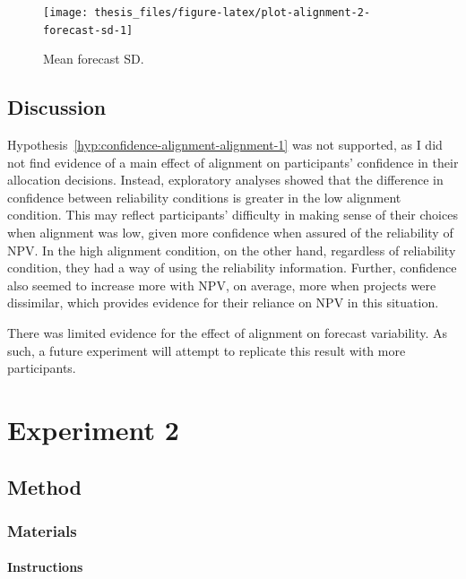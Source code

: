 \documentclass[a4paper, nobind, dvipsnames]{templates/ociamthesis}
\theoremstyle{definition}
\theoremstyle{definition}
\theoremstyle{definition}
\theoremstyle{definition}
\theoremstyle{remark}
\begin{document}
\begin{figure}
\texttt{[image: thesis\_files/figure-latex/plot-alignment-2-forecast-sd-1]} \caption{Mean forecast SD.}\label{fig:plot-alignment-2-forecast-sd}
\end{figure}

\hypertarget{discussion-9}{%
\subsection{Discussion}\label{discussion-9}}

Hypothesis~\ref{hyp:confidence-alignment-alignment-1} was not supported, as I did not find evidence of a main effect of alignment on participants' confidence in their allocation decisions. Instead, exploratory analyses showed that the difference in confidence between reliability conditions is greater in the low alignment condition. This may reflect participants' difficulty in making sense of their choices when alignment was low, given more confidence when assured of the reliability of NPV. In the high alignment condition, on the other hand, regardless of reliability condition, they had a way of using the reliability information. Further, confidence also seemed to increase more with NPV, on average, more when projects were dissimilar, which provides evidence for their reliance on NPV in this situation.

There was limited evidence for the effect of alignment on forecast variability. As such, a future experiment will attempt to replicate this result with more participants.

\hypertarget{alignment-3-appendix}{%
\section{Experiment 2}\label{alignment-3-appendix}}

\hypertarget{method-11}{%
\subsection{Method}\label{method-11}}

\hypertarget{materials-10}{%
\subsubsection{Materials}\label{materials-10}}

\hypertarget{instructions-materials-alignment-3-appendix}{%
\paragraph{Instructions}\label{instructions-materials-alignment-3-appendix}}
\end{document}

